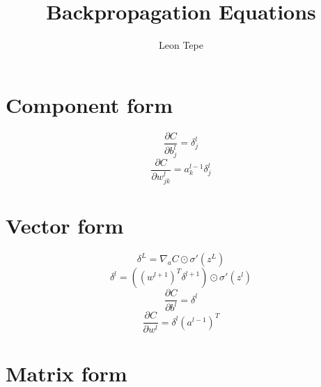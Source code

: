 \documentclass{article}
\title{Backpropagation Equations}
\author{Leon Tepe}
\date{}
\begin{document}
    \maketitle

    \section{Component form}
    \begin{equation}
        \frac{\partial C}{\partial b_j^l} = \delta_j^l
    \end{equation}
    \begin{equation}
        \frac{\partial C}{\partial w^l_{jk}} = a_k^{l-1} \delta_j^l
    \end{equation}

    \section{Vector form}
    \begin{equation}
        \delta^{L} = \nabla_a C \odot \sigma' (z^{L})
    \end{equation}
    \begin{equation}
        \delta^l = ((w^{l+1})^T \delta^{l+1}) \odot \sigma'(z^l)
    \end{equation}
    \begin{equation}
        \frac{\partial C}{\partial b^l} = \delta^l
    \end{equation}
    \begin{equation}
        \frac{\partial C}{\partial w^l} = \delta^l (a^{l-1})^T
    \end{equation}

    \section{Matrix form}
\end{document}
